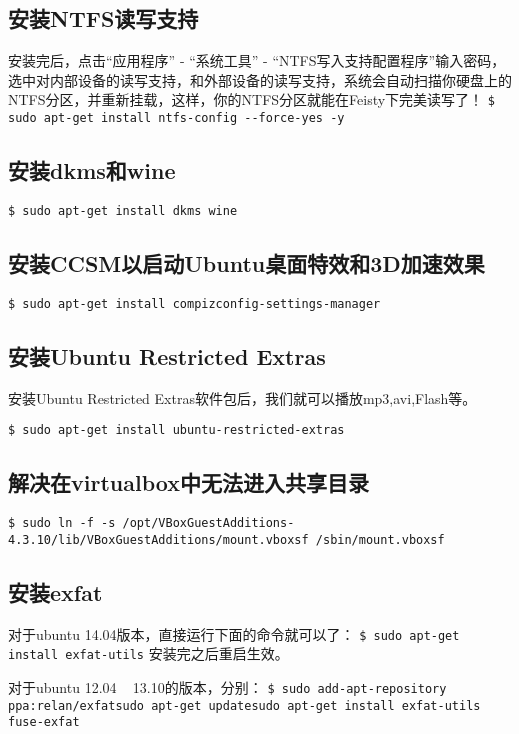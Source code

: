 \subsection{安装NTFS读写支持} 
安装完后，点击“应用程序” - “系统工具” - “NTFS写入支持配置程序”输入密码，选中对内部设备的读写支持，和外部设备的读写支持，系统会自动扫描你硬盘上的NTFS分区，并重新挂载，这样，你的NTFS分区就能在Feisty下完美读写了！
\verb"$ sudo apt-get install ntfs-config --force-yes -y"

\subsection{安装dkms和wine}
\verb"$ sudo apt-get install dkms wine"

\subsection{安装CCSM以启动Ubuntu桌面特效和3D加速效果}
\verb"$ sudo apt-get install compizconfig-settings-manager"

\subsection{安装Ubuntu Restricted Extras}
安装Ubuntu Restricted Extras软件包后，我们就可以播放mp3,avi,Flash等。

\verb"$ sudo apt-get install ubuntu-restricted-extras"

\subsection {解决在virtualbox中无法进入共享目录}
\verb"$ sudo ln -f -s /opt/VBoxGuestAdditions-4.3.10/lib/VBoxGuestAdditions/mount.vboxsf /sbin/mount.vboxsf"

\subsection {安装exfat}
对于ubuntu 14.04版本，直接运行下面的命令就可以了：
\verb"$ sudo apt-get install exfat-utils"
安装完之后重启生效。

对于ubuntu 12.04 ~ 13.10的版本，分别：
\verb"$ sudo add-apt-repository ppa:relan/exfatsudo apt-get updatesudo apt-get install exfat-utils fuse-exfat"
